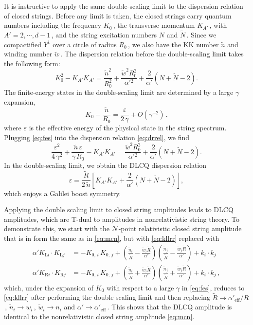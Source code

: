 \documentclass[11pt]{article}
\newcommand{\be}{\begin{equation}}
\newcommand{\ee}{\end{equation}}
\newcommand{\CN}{\mathcal{N}}
\newcommand{\lr}{\left (}
\newcommand{\rr}{\right )}
\renewcommand{\tilde}[1]{\widetilde{#1}}
\begin{document}
It is instructive to apply the same double-scaling limit to the dispersion relation of closed strings. Before any limit is taken, the closed strings carry quantum numbers including the frequency $K_0$\,, the transverse momentum $K_{A'}$\,, with $A' = 2, \cdots, d-1$\,, and the string excitation numbers $N$ and $\tilde{N}$\,. Since we compactified $Y^1$ over a circle of radius $R_0$\,, we also have the KK number $\tilde{n}$ and winding number $\tilde{w}$\,. The dispersion relation before the double-scaling limit takes the following form:
%
\be \label{eq:drrel}
    K_0^2 - K_{A'} K_{A'} = \frac{\tilde{n}^2}{R_0^2} + \frac{\tilde{w}^2 R_0^2}{\alpha'{}^2} + \frac{2}{\alpha'} \left( N + \tilde{N} - 2 \right).
\ee
%
The finite-energy states in the double-scaling limit are determined by a large $\gamma$ expansion,
%
\be \label{eq:fes}
    K_0 - \frac{\tilde{n}}{R_0} = \frac{\varepsilon}{2 \, \gamma} + O(\gamma^{-2})\,.
\ee
%
where $\varepsilon$ is the effective energy of the physical state in the string spectrum.
%
Plugging \eqref{eq:fes} into the dispersion relation \eqref{eq:drrel}, we find
%
\be
    \frac{\varepsilon^2}{4 \, \gamma^2} + \frac{\tilde{n} \, \varepsilon}{\gamma \, R_0} - K_{A'} K_{A'} = \frac{\tilde{w}^2 R_0^2}{\alpha'{}^2} + \frac{2}{\alpha'} \left( N + \tilde{N} - 2 \right).
\ee 
%
In the double-scaling limit, we obtain the DLCQ dispersion relation
%
\be \label{eq:dlcqdr}
    \varepsilon = \frac{\tilde{R}}{2 \, \tilde{n}} \left[ K_{A'} K_{A'} + \frac{2}{\alpha'} \left( N + \tilde{N} - 2 \right) \right],
\ee
%
which enjoys a Galilei boost symmetry. 

Applying the double scaling limit to closed string amplitudes leads to DLCQ amplitudes, which are T-dual to amplitudes in nonrelativistic string theory.  To demonstrate this, we start with the $\CN$-point relativistic closed string amplitude that is in form the same as in \eqref{eq:mcn}, but with \eqref{eq:kllrr} replaced with
%
\begin{subequations} \label{eq:kijdlcqlimit}
\begin{align}
    \alpha' K_{\text{L}i} \cdot K_{\text{L}j} & = - K_{0,\,i} \, K_{0,\,j} + \lr \frac{\tilde{n}_i}{\tilde{R}} - \frac{\tilde{w}_i \tilde{R}}{\alpha'} \rr \lr \frac{\tilde{n}_j}{\tilde{R}} - \frac{\tilde{w}_j \tilde{R}}{\alpha'} \rr + k_i \cdot k_j \\[2pt]
    \alpha' K_{\text{R}i} \cdot K_{\text{R}j} & = - K_{0,\,i} \, K_{0,\,j} + \lr \frac{\tilde{n}_i}{\tilde{R}} + \frac{\tilde{w}_i \tilde{R}}{\alpha'} \rr \lr \frac{\tilde{n}_j}{\tilde{R}} + \frac{\tilde{w}_j \tilde{R}}{\alpha'} \rr + k_i \cdot k_j\,,
\end{align}
\end{subequations}
%
which, under the expansion of $K_0$ with respect to a large $\gamma$ in \eqref{eq:fes}, reduces to \eqref{eq:kllrr} after performing the double scaling limit and then replacing $\tilde{R} \rightarrow \alpha'_{\text{eff}} / R$\,, $\tilde{n}_i \rightarrow w_i$\,, $\tilde{w}_i \rightarrow n_i$ and $\alpha' \rightarrow \alpha'_\text{eff}$\,. This shows that the DLCQ amplitude is identical to the nonrelativistic closed string amplitude \eqref{eq:mcn}.
\end{document}
